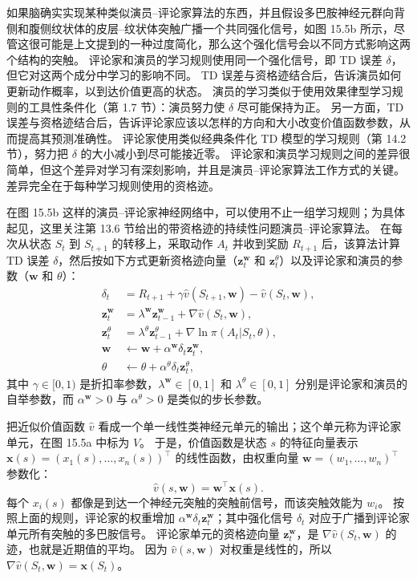 \documentclass[UTF8,12pt,a4paper,fontset=fandol]{ctexart}
\begin{document}
如果脑确实实现某种类似演员--评论家算法的东西，并且假设多巴胺神经元群向背侧和腹侧纹状体的皮层--纹状体突触广播一个共同强化信号，如图 15.5b 所示，尽管这很可能是上文提到的一种过度简化，那么这个强化信号会以不同方式影响这两个结构的突触。
评论家和演员的学习规则使用同一个强化信号，即 TD 误差 $\delta$，但它对这两个成分中学习的影响不同。
TD 误差与资格迹结合后，告诉演员如何更新动作概率，以到达价值更高的状态。
演员的学习类似于使用效果律型学习规则的工具性条件化（第 1.7 节）：演员努力使 $\delta$ 尽可能保持为正。
另一方面，TD 误差与资格迹结合后，告诉评论家应该以怎样的方向和大小改变价值函数参数，从而提高其预测准确性。
评论家使用类似经典条件化 TD 模型的学习规则（第 14.2 节），努力把 $\delta$ 的大小减小到尽可能接近零。
评论家和演员学习规则之间的差异很简单，但这个差异对学习有深刻影响，并且是演员--评论家算法工作方式的关键。
差异完全在于每种学习规则使用的资格迹。

在图 15.5b 这样的演员--评论家神经网络中，可以使用不止一组学习规则；为具体起见，这里关注第 13.6 节给出的带资格迹的持续性问题演员--评论家算法。
在每次从状态 $S_t$ 到 $S_{t+1}$ 的转移上，采取动作 $A_t$ 并收到奖励 $R_{t+1}$ 后，该算法计算 TD 误差 $\delta$，然后按如下方式更新资格迹向量（$\mathbf{z}_t^{\mathbf{w}}$ 和 $\mathbf{z}_t^\theta$）以及评论家和演员的参数（$\mathbf{w}$ 和 $\theta$）：
\[
\begin{aligned}
\delta_t &= R_{t+1}+\gamma \hat v(S_{t+1},\mathbf{w})-\hat v(S_t,\mathbf{w}),\\
\mathbf{z}_t^{\mathbf{w}} &= \lambda^{\mathbf{w}}\mathbf{z}_{t-1}^{\mathbf{w}}+\nabla \hat v(S_t,\mathbf{w}),\\
\mathbf{z}_t^\theta &= \lambda^\theta \mathbf{z}_{t-1}^\theta+\nabla \ln \pi(A_t|S_t,\theta),\\
\mathbf{w} &\leftarrow \mathbf{w}+\alpha^{\mathbf{w}}\delta_t\mathbf{z}_t^{\mathbf{w}},\\
\theta &\leftarrow \theta+\alpha^\theta\delta_t\mathbf{z}_t^\theta,
\end{aligned}
\]
其中 $\gamma\in[0,1)$ 是折扣率参数，$\lambda^{\mathbf{w}}\in[0,1]$ 和 $\lambda^\theta\in[0,1]$ 分别是评论家和演员的自举参数，而 $\alpha^{\mathbf{w}}>0$ 与 $\alpha^\theta>0$ 是类似的步长参数。

把近似价值函数 $\hat v$ 看成一个单一线性类神经元单元的输出；这个单元称为评论家单元，在图 15.5a 中标为 $V$。
于是，价值函数是状态 $s$ 的特征向量表示 $\mathbf{x}(s)=(x_1(s),\ldots,x_n(s))^\top$ 的线性函数，由权重向量 $\mathbf{w}=(w_1,\ldots,w_n)^\top$ 参数化：
\begin{equation}
\hat v(s,\mathbf{w})=\mathbf{w}^\top\mathbf{x}(s).
\tag{15.1}
\end{equation}
每个 $x_i(s)$ 都像是到达一个神经元突触的突触前信号，而该突触效能为 $w_i$。
按照上面的规则，评论家的权重增加 $\alpha^{\mathbf{w}}\delta_t\mathbf{z}_t^{\mathbf{w}}$；其中强化信号 $\delta_t$ 对应于广播到评论家单元所有突触的多巴胺信号。
评论家单元的资格迹向量 $\mathbf{z}_t^{\mathbf{w}}$，是 $\nabla\hat v(S_t,\mathbf{w})$ 的迹，也就是近期值的平均。
因为 $\hat v(s,\mathbf{w})$ 对权重是线性的，所以 $\nabla\hat v(S_t,\mathbf{w})=\mathbf{x}(S_t)$。
\end{document}
